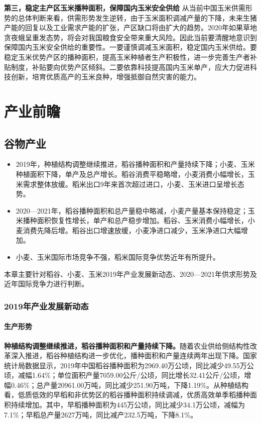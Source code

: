 \documentclass{progbookcn}
\begin{document}
\textbf{第三，稳定主产区玉米播种面积，保障国内玉米安全供给}
从当前中国玉米供需形势的总体判断来看，供需形势发生逆转，由于玉米面积调减产量的下降，未来生猪产能的回复以及工业需求产能的扩张，产区缺口将由扩大的趋势。2020年如果草地贪夜蛾呈重发态势，将会对我国粮食安全带来重大风险。因此当前要清醒地意识到保障国内玉米安全供给的重要性。一要谨慎调减玉米面积，稳定国内玉米供给。要稳定玉米优势产区的播种面积，提高玉米种植者生产积极性，进一步完善生产者补贴制度，补贴要向优势产区倾斜。二要依靠科技提高国内玉米单产，应大力促进科技创新，培育优质高产的玉米良种，增强抵御自然灾害的能力。

\part{产业前瞻}
\chapter{谷物产业}
\begin{titledbox}{}
\begin{itemize}
  \item 2019年，种植结构调整继续推进，稻谷播种面积和产量持续下降；小麦、玉米种植面积下降，单产及总产增长。稻谷消费平稳略增，小麦消费小幅增长，玉米需求整体放缓。稻米出口9年来首次超过进口，小麦、玉米进口呈增长态势。
  \item 2020—2021年，稻谷播种面积和总产量稳中略减，小麦产量基本保持稳定；玉米播种面积恢复性增长，单产和总产稳步增加。稻谷、玉米消费小幅增长，小麦消费先降后增。稻谷出口增速放缓，小麦净进口减少，玉米净进口大幅增加。
  \item 小麦、玉米国际市场竞争不强，稻米国际竞争优势近年有所提升。
 \end{itemize}
\end{titledbox}

本章主要针对稻谷、小麦、玉米2019年产业发展新动态、2020—2021年供求形势及近年国际竞争力进行判断。

\section{2019年产业发展新动态}
\subsection{生产形势}
\textbf{种植结构调整继续推进，稻谷播种面积和产量持续下降。}随着农业供给侧结构性改革深入推进，稻谷种植结构进一步优化，播种面积和产量连续两年出现下降。国家统计局数据显示，2019年中国稻谷播种面积为2969.40万公顷，同比减少49.55万公顷，减幅1.64\%；单位面积产量7059.00公斤/公顷，同比增长32.41公斤/公顷，增幅0.46\%；总产量20961.00万吨，同比减少251.90万吨，下降1.19\%。从种植结构看，低质低效的早稻和非优势区的稻谷播种面积持续调减，优质高效单季稻播种面积持续增加。其中，早稻播种面积为445万公顷，同比减少34.1万公顷，减幅为7.1\%；早稻总产量2627万吨，同比减产232.5万吨，下降8.1\%。
\end{document}
